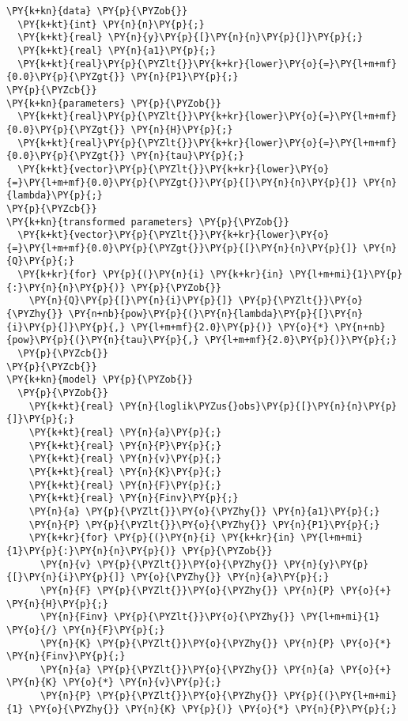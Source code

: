 \begin{Verbatim}[commandchars=\\\{\}]
\PY{k+kn}{data} \PY{p}{\PYZob{}}
  \PY{k+kt}{int} \PY{n}{n}\PY{p}{;}
  \PY{k+kt}{real} \PY{n}{y}\PY{p}{[}\PY{n}{n}\PY{p}{]}\PY{p}{;}
  \PY{k+kt}{real} \PY{n}{a1}\PY{p}{;}
  \PY{k+kt}{real}\PY{p}{\PYZlt{}}\PY{k+kr}{lower}\PY{o}{=}\PY{l+m+mf}{0.0}\PY{p}{\PYZgt{}} \PY{n}{P1}\PY{p}{;}
\PY{p}{\PYZcb{}}
\PY{k+kn}{parameters} \PY{p}{\PYZob{}}
  \PY{k+kt}{real}\PY{p}{\PYZlt{}}\PY{k+kr}{lower}\PY{o}{=}\PY{l+m+mf}{0.0}\PY{p}{\PYZgt{}} \PY{n}{H}\PY{p}{;}
  \PY{k+kt}{real}\PY{p}{\PYZlt{}}\PY{k+kr}{lower}\PY{o}{=}\PY{l+m+mf}{0.0}\PY{p}{\PYZgt{}} \PY{n}{tau}\PY{p}{;}
  \PY{k+kt}{vector}\PY{p}{\PYZlt{}}\PY{k+kr}{lower}\PY{o}{=}\PY{l+m+mf}{0.0}\PY{p}{\PYZgt{}}\PY{p}{[}\PY{n}{n}\PY{p}{]} \PY{n}{lambda}\PY{p}{;}
\PY{p}{\PYZcb{}}
\PY{k+kn}{transformed parameters} \PY{p}{\PYZob{}}
  \PY{k+kt}{vector}\PY{p}{\PYZlt{}}\PY{k+kr}{lower}\PY{o}{=}\PY{l+m+mf}{0.0}\PY{p}{\PYZgt{}}\PY{p}{[}\PY{n}{n}\PY{p}{]} \PY{n}{Q}\PY{p}{;}
  \PY{k+kr}{for} \PY{p}{(}\PY{n}{i} \PY{k+kr}{in} \PY{l+m+mi}{1}\PY{p}{:}\PY{n}{n}\PY{p}{)} \PY{p}{\PYZob{}}
    \PY{n}{Q}\PY{p}{[}\PY{n}{i}\PY{p}{]} \PY{p}{\PYZlt{}}\PY{o}{\PYZhy{}} \PY{n+nb}{pow}\PY{p}{(}\PY{n}{lambda}\PY{p}{[}\PY{n}{i}\PY{p}{]}\PY{p}{,} \PY{l+m+mf}{2.0}\PY{p}{)} \PY{o}{*} \PY{n+nb}{pow}\PY{p}{(}\PY{n}{tau}\PY{p}{,} \PY{l+m+mf}{2.0}\PY{p}{)}\PY{p}{;}
  \PY{p}{\PYZcb{}}
\PY{p}{\PYZcb{}}
\PY{k+kn}{model} \PY{p}{\PYZob{}}
  \PY{p}{\PYZob{}}
    \PY{k+kt}{real} \PY{n}{loglik\PYZus{}obs}\PY{p}{[}\PY{n}{n}\PY{p}{]}\PY{p}{;}
    \PY{k+kt}{real} \PY{n}{a}\PY{p}{;}
    \PY{k+kt}{real} \PY{n}{P}\PY{p}{;}
    \PY{k+kt}{real} \PY{n}{v}\PY{p}{;}
    \PY{k+kt}{real} \PY{n}{K}\PY{p}{;}
    \PY{k+kt}{real} \PY{n}{F}\PY{p}{;}
    \PY{k+kt}{real} \PY{n}{Finv}\PY{p}{;}
    \PY{n}{a} \PY{p}{\PYZlt{}}\PY{o}{\PYZhy{}} \PY{n}{a1}\PY{p}{;}
    \PY{n}{P} \PY{p}{\PYZlt{}}\PY{o}{\PYZhy{}} \PY{n}{P1}\PY{p}{;}
    \PY{k+kr}{for} \PY{p}{(}\PY{n}{i} \PY{k+kr}{in} \PY{l+m+mi}{1}\PY{p}{:}\PY{n}{n}\PY{p}{)} \PY{p}{\PYZob{}}
      \PY{n}{v} \PY{p}{\PYZlt{}}\PY{o}{\PYZhy{}} \PY{n}{y}\PY{p}{[}\PY{n}{i}\PY{p}{]} \PY{o}{\PYZhy{}} \PY{n}{a}\PY{p}{;}
      \PY{n}{F} \PY{p}{\PYZlt{}}\PY{o}{\PYZhy{}} \PY{n}{P} \PY{o}{+} \PY{n}{H}\PY{p}{;}
      \PY{n}{Finv} \PY{p}{\PYZlt{}}\PY{o}{\PYZhy{}} \PY{l+m+mi}{1} \PY{o}{/} \PY{n}{F}\PY{p}{;}
      \PY{n}{K} \PY{p}{\PYZlt{}}\PY{o}{\PYZhy{}} \PY{n}{P} \PY{o}{*} \PY{n}{Finv}\PY{p}{;}
      \PY{n}{a} \PY{p}{\PYZlt{}}\PY{o}{\PYZhy{}} \PY{n}{a} \PY{o}{+} \PY{n}{K} \PY{o}{*} \PY{n}{v}\PY{p}{;}
      \PY{n}{P} \PY{p}{\PYZlt{}}\PY{o}{\PYZhy{}} \PY{p}{(}\PY{l+m+mi}{1} \PY{o}{\PYZhy{}} \PY{n}{K} \PY{p}{)} \PY{o}{*} \PY{n}{P}\PY{p}{;}

\end{Verbatim}
